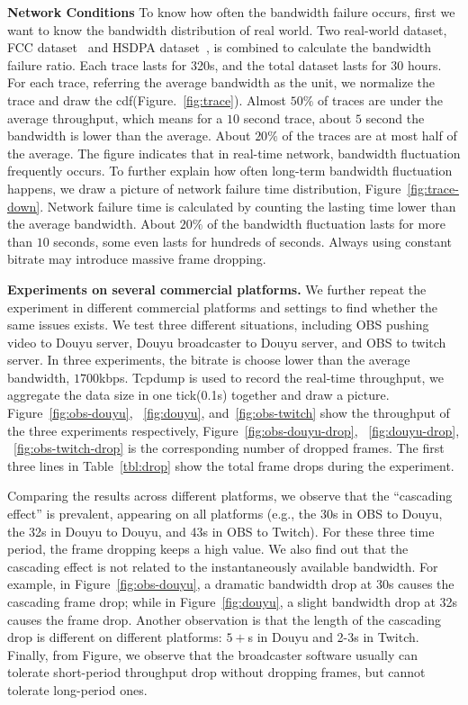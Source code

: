 
\textbf{Network Conditions} To know how often the bandwidth failure occurs, first we want to know the bandwidth distribution of real world. Two real-world dataset, FCC dataset~\cite{FCC_dataset} and HSDPA dataset~\cite{HSDPA_dataset}, is combined to calculate the bandwidth failure ratio. Each trace lasts for 320s, and the total dataset lasts for $30$ hours. For each trace, referring the average bandwidth as the unit, we normalize the trace and draw the cdf(Figure.~\ref{fig:trace}). Almost $50\%$ of traces are under the average throughput, which means for a $10$ second trace, about $5$ second the bandwidth is lower than the average. About $20\%$ of the traces are at most half of the average. The figure indicates that in real-time network, bandwidth fluctuation frequently occurs. To further explain how often long-term bandwidth fluctuation happens, we draw a picture of network failure time distribution, Figure~\ref{fig:trace-down}. Network failure time is calculated by counting the lasting time lower than the average bandwidth. About $20\%$ of the bandwidth fluctuation lasts for more than $10$ seconds, some even lasts for hundreds of seconds. Always using constant bitrate may introduce massive frame dropping.


\textbf{Experiments on several commercial platforms.} We further repeat the experiment in different commercial platforms and settings to find whether the same issues exists. We test three different situations, including OBS pushing video to Douyu server, Douyu broadcaster to Douyu server, and OBS to twitch server. In three experiments, the bitrate is choose lower than the average bandwidth, $1700$kbps. Tcpdump is used to record the real-time throughput, we aggregate the data size in one tick(0.1s) together and draw a picture.
Figure~\ref{fig:obs-douyu}, ~\ref{fig:douyu}, and~\ref{fig:obs-twitch} show the throughput of the three experiments respectively, Figure~\ref{fig:obs-douyu-drop}, ~\ref{fig:douyu-drop}, ~\ref{fig:obs-twitch-drop} is the corresponding number of dropped frames. The first three lines in Table~\ref{tbl:drop} show the total frame drops during the experiment.

Comparing the results across different platforms, we observe that the ``cascading effect'' is prevalent, appearing on all platforms (e.g., the 30s in OBS to Douyu, the 32s in Douyu to Douyu, and 43s in OBS to Twitch). For these three time period, the frame dropping keeps a high value. We also find out that the cascading effect is not related to the instantaneously available bandwidth. For example, in Figure~\ref{fig:obs-douyu}, a dramatic bandwidth drop at 30s causes the cascading frame drop; while in Figure~\ref{fig:douyu}, a slight bandwidth drop at 32s causes the frame drop. Another observation is that the length of the cascading drop is different on different platforms: $5+$s in Douyu and 2-3s in Twitch. Finally, from Figure, we observe that the broadcaster software usually can tolerate short-period throughput drop without dropping frames, but cannot tolerate long-period ones.


